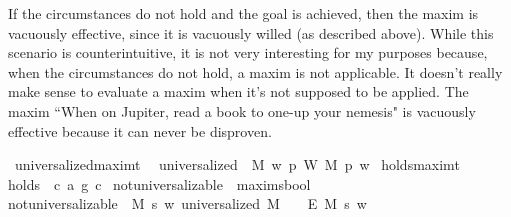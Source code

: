 \begin{isabellebody}
\begin{isamarkuptext}
If the circumstances do not hold and the goal is achieved, then the maxim is vacuously effective, since 
it is vacuously willed (as described above). While this scenario is counterintuitive, it is not very 
interesting for my purposes because, when the circumstances do not hold, a maxim is not applicable. It 
doesn't really make sense to evaluate a maxim when it's not supposed to be applied. The maxim ``When on Jupiter,
read a book to one-up your nemesis" is vacuously effective because it can never be disproven.%
\end{isamarkuptext}\isamarkuptrue%
\isamarkupfalse%
\ universalized{\isacharcolon}{\isacharcolon}{\isachardoublequoteopen}maxim{\isasymRightarrow}t{\isachardoublequoteclose}\ \ \isanewline
{\isachardoublequoteopen}universalized\ {\isasymequiv}\ {\isasymlambda}M{\isachardot}\ {\isacharparenleft}{\isasymlambda}w{\isachardot}\ {\isacharparenleft}{\isasymforall}p{\isachardot}\ {\isacharparenleft}W\ M\ p{\isacharparenright}\ w{\isacharparenright}{\isacharparenright}{\isachardoublequoteclose}\isanewline
\isanewline
{}\isamarkupfalse%
\ holds{\isacharcolon}{\isacharcolon}{\isachardoublequoteopen}maxim{\isasymRightarrow}t{\isachardoublequoteclose}\ \ \isanewline
{\isachardoublequoteopen}holds\ {\isasymequiv}\ {\isasymlambda}{\isacharparenleft}c{\isacharcomma}\ a{\isacharcomma}\ g{\isacharparenright}{\isachardot}\ c{\isachardoublequoteclose}\isanewline
\isanewline
{}\isamarkupfalse%
\ not{\isacharunderscore}universalizable\ {\isacharcolon}{\isacharcolon}\ {\isachardoublequoteopen}maxim{\isasymRightarrow}s{\isasymRightarrow}bool{\isachardoublequoteclose}\ \ \isanewline
{\isachardoublequoteopen}not{\isacharunderscore}universalizable\ {\isasymequiv}\ {\isasymlambda}M\ s{\isachardot}\ {\isasymforall}w{\isachardot}\ {\isacharparenleft}{\isacharparenleft}universalized\ M{\isacharparenright}\ \ \isactrlbold {\isasymrightarrow}\ {\isacharparenleft}\isactrlbold {\isasymnot}\ {\isacharparenleft}E\ M\ s{\isacharparenright}{\isacharparenright}{\isacharparenright}\ w{\isachardoublequoteclose}\isanewline
%
\end{isabellebody}
